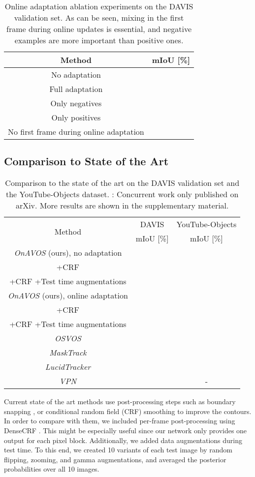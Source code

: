 \documentclass{bmvc2k}
\newcommand{\methodname}[1]{\mbox{\emph{#1}}}
\begin{document}
\begin{table}
\small
\begin{center}
\begin{tabular}{|c|c|}
\hline
Method & mIoU {[}\%{]}\tabularnewline
\hline
\hline
No adaptation & \tabularnewline
Full adaptation & \tabularnewline
Only negatives & \tabularnewline
Only positives & \tabularnewline
No first frame during online adaptation & \tabularnewline
\hline
\end{tabular}
\end{center}
\caption{\label{tab:online}Online adaptation ablation experiments on the DAVIS validation set. As can be seen, mixing in the first frame during online updates is essential, and negative examples are more important than positive ones.}
\end{table}



\subsection{Comparison to State of the Art}


\begin{table}
\small
\begin{center}
\begin{tabular}{|c|c|c|}
\hline
\multirow{2}{*}{Method} & DAVIS & YouTube-Objects\tabularnewline
 & mIoU {[}\%{]} & mIoU {[}\%{]}\tabularnewline
\hline
\hline
\methodname{OnAVOS} (ours), no adaptation &  &  \tabularnewline
+CRF &  &  \tabularnewline
+CRF +Test time augmentations &  &  \tabularnewline
\hline
\methodname{OnAVOS} (ours), online adaptation &  &  \tabularnewline
+CRF &  & \tabularnewline
+CRF +Test time augmentations &  &  \tabularnewline
\hline
\methodname{OSVOS} \cite{OSVOS} &  & \tabularnewline
\methodname{MaskTrack} \cite{masktrack} &  & \tabularnewline
\methodname{LucidTracker} \cite{lucidtracker}  &  & \tabularnewline
\methodname{VPN} \cite{videopropnetworks} &  & - \tabularnewline
\hline
\end{tabular}
\end{center}
\caption{\label{tab:SOTA}Comparison to the state of the art on the DAVIS validation set and the YouTube-Objects dataset. : Concurrent
work only published on arXiv. More results are shown in the supplementary material.}
\end{table}

Current state of the art methods use post-processing steps such as boundary snapping \cite{OSVOS}, or conditional random field (CRF) smoothing \cite{masktrack, lucidtracker} to improve the contours. In order to compare with them, we included per-frame post-processing using DenseCRF \cite{CRF}. This might be especially useful since our network only provides one output for each  pixel block. Additionally, we added data augmentations during test time. To this end, we created 10 variants of each test image by random flipping, zooming, and gamma augmentations, and averaged the posterior probabilities over all 10 images. 
\end{document}
